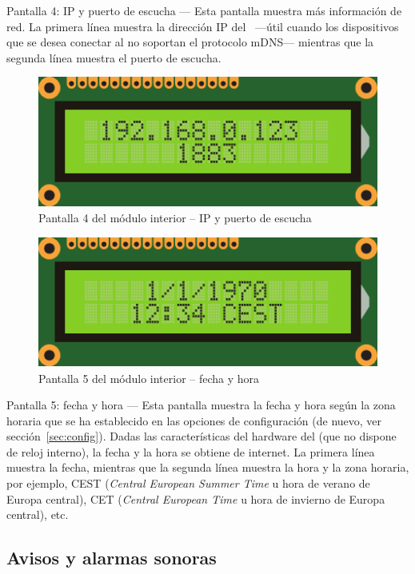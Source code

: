 \begin{descriptioncompact}
\item[Pantalla 4: IP y puerto de escucha] --- Esta pantalla muestra más información de red. La primera línea muestra la dirección IP del \MIE~---útil cuando los dispositivos que se desea conectar al \MI no soportan el protocolo mDNS--- mientras que la segunda línea muestra el puerto de escucha.

\begin{figure}
  \centering
  \includegraphics[width=0.6\columnwidth]{images/screen4}
  \caption{Pantalla 4 del módulo interior -- IP y puerto de escucha}
  \label{fig:screen4}
\end{figure}

\begin{figure}
  \centering
  \includegraphics[width=0.6\columnwidth]{images/screen5}
  \caption{Pantalla 5 del módulo interior -- fecha y hora}
  \label{fig:screen5}
\end{figure}

\item[Pantalla 5: fecha y hora] --- Esta pantalla muestra la fecha y hora según la zona horaria que se ha establecido en las opciones de configuración (de nuevo, ver sección~\ref{sec:config}). Dadas las características del hardware del \CMS (que no dispone de reloj interno), la fecha y la hora se obtiene de internet. La primera línea muestra la fecha, mientras que la segunda línea muestra la hora y la zona horaria, por ejemplo, CEST (\textit{Central European Summer Time} u hora de verano de Europa central), CET (\textit{Central European Time} u hora de invierno de Europa central), etc.

\end{descriptioncompact}


\subsection{Avisos y alarmas sonoras}
\label{sec:alarmas}


